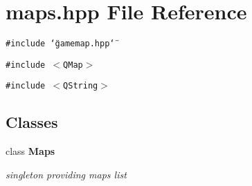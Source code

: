 \section{maps.hpp File Reference}
\label{maps_8hpp}
{\tt \#include \char`\"{}gamemap.hpp\char`\"{}}\par
{\tt \#include $<$QMap$>$}\par
{\tt \#include $<$QString$>$}\par
\subsection*{Classes}
\begin{CompactItemize}
\item 
class {\bf Maps}
\begin{CompactList}\small\item\em singleton providing maps list \item\end{CompactList}\end{CompactItemize}
